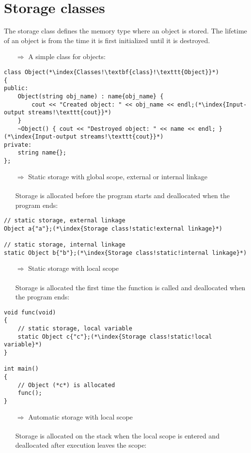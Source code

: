 \documentclass[10pt]{article}
\begin{document}
\section{Storage classes}
\small
The storage class defines the memory type where an object is stored. The lifetime of an object is from the time it is first initialized until it is destroyed.
\begin{enumerate}
\item[$\Rightarrow$] A simple class for objects:
\end{enumerate}
\begin{lstlisting}
class Object(*\index{Classes!\textbf{class}!\texttt{Object}}*)
{
public:
    Object(string obj_name) : name{obj_name} {
        cout << "Created object: " << obj_name << endl;(*\index{Input-output streams!\texttt{cout}}*)
    }
    ~Object() { cout << "Destroyed object: " << name << endl; }(*\index{Input-output streams!\texttt{cout}}*)
private:
    string name{};
};
\end{lstlisting}
\begin{enumerate}
\item[$\Rightarrow$] Static storage with global scope, external or internal linkage\\ \\ Storage is allocated before the program starts and deallocated when the program ends:
\end{enumerate}
\begin{lstlisting}
// static storage, external linkage
Object a{"a"};(*\index{Storage class!static!external linkage}*)

// static storage, internal linkage
static Object b{"b"};(*\index{Storage class!static!internal linkage}*)
\end{lstlisting}
\begin{enumerate}
\item[$\Rightarrow$] Static storage with local scope\\ \\ Storage is allocated the first time the function is called and deallocated when the program ends:
\end{enumerate}
\begin{lstlisting}
void func(void)
{
    // static storage, local variable
    static Object c{"c"};(*\index{Storage class!static!local variable}*)
}

int main()
{
    // Object (*c*) is allocated
    func();
}
\end{lstlisting}
\begin{enumerate}
\item[$\Rightarrow$] Automatic storage with local scope\\ \\ Storage is allocated on the stack when the local scope is entered and deallocated after execution leaves the scope:
\end{enumerate}
\end{document}
